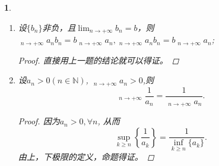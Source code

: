 \documentclass[utf8]{book}
\newtheorem{example}{}[section]             %
\DeclareMathOperator*\lowlim{\underline{lim}}
\DeclareMathOperator*\uplim{\overline{lim}}
\begin{document}
\begin{example}
\begin{enumerate}
\begin{proof}
现在我们来证明第二式。取子列$\{b_{n_k}\}$使得
$$\displaystyle\lim_{k\to +\infty}b_{n_k}=\displaystyle\uplim_{n\to +\infty}b_n.$$
对于相对应的$\{a_{n_k}\}$, 我们再取子列$\{a_{n_{k_l}}\}$使得
$$\displaystyle\lim_{l\to +\infty}a_{n_{k_l}} = \displaystyle\lowlim_{k\to +\infty}a_{n_k}\geq \displaystyle\lowlim_{n\to +\infty}a_n.$$
所以
\begin{equation*}
\begin{split}
\displaystyle\lowlim_{n\to +\infty}a_n \cdot \displaystyle\uplim_{n\to +\infty}b_n &\leq \displaystyle\lim_{l\to +\infty}a_{n_{k_l}}\cdot \displaystyle\lim_{l\to +\infty}b_{n_{k_l}} \\&=\displaystyle\lim_{l\to +\infty}a_{n_{k_l}}b_{n_{k_l}} \\&\leq \displaystyle\uplim_{k\to +\infty}a_{n_k}b_{n_k}\\&\leq \displaystyle\uplim_{n\to +\infty}a_nb_n
\end{split}
\end{equation*}
取子列$\{a_{n_k}b_{n_k}\}$使得
$$\displaystyle\lim_{k\to +\infty}a_{n_k}b_{n_k}=\displaystyle\uplim_{n\to +\infty}a_nb_n.$$
在$\{a_{n_k}\}$取收敛子列$\{a_{n_{k_l}}\}$使得
$$\displaystyle\lim_{l\to +\infty}a_{n_{k_l}} =\displaystyle\uplim_{k\to +\infty}a_{n_k}\leq \displaystyle\uplim_{n\to +\infty}a_n.$$
另一方面
$$\displaystyle\uplim_{l\to +\infty}b_{n_{k_l}}\leq \displaystyle\uplim_{k\to +\infty}b_{n_k}\leq \displaystyle\uplim_{n\to +\infty}b_n.$$
所以
\begin{equation*}
\begin{split}
\displaystyle\uplim_{n\to +\infty}a_nb_n &= \displaystyle\uplim_{l\to +\infty}a_{n_{k_l}}b_{n_{k_l}} \\&\leq \displaystyle\lim_{l\to +\infty}a_{n_{k_l}} \cdot\displaystyle\uplim_{l\to +\infty}b_{n_{k_l}}\\&\leq \displaystyle\uplim_{n\to +\infty}a_n\cdot \displaystyle\uplim_{n\to +\infty}b_n
\end{split}
\end{equation*}
\end{proof}
\item 设$\{b_n\}$非负，且$\displaystyle\lim_{n\to +\infty}b_n=b$，则\\
$\displaystyle\lowlim_{n\to +\infty}a_nb_n=b\displaystyle\lowlim_{n\to +\infty}a_n, \displaystyle\uplim_{n\to +\infty}a_nb_n=b\displaystyle\uplim_{n\to +\infty}a_n$;
\begin{proof}
直接用上一题的结论就可以得证。
\end{proof}
\item 设$a_n > 0(n\in\mathbb{N})$, $\displaystyle\lowlim_{n\to +\infty}a_n > 0$,则
$$\displaystyle\uplim_{n\to +\infty}\frac{1}{a_n} = \frac{1}{\displaystyle\lowlim_{n\to +\infty}a_n}.$$
\begin{proof}
因为$a_n > 0, \forall n$, 从而
$$\displaystyle\sup_{k \geq n}\left\{\frac{1}{a_k}\right\} = \frac{1}{\displaystyle\inf_{k \geq n}\{a_k\}}.$$
由上，下极限的定义，命题得证。
\end{proof}
\end{enumerate}
\end{example}
\end{document}
